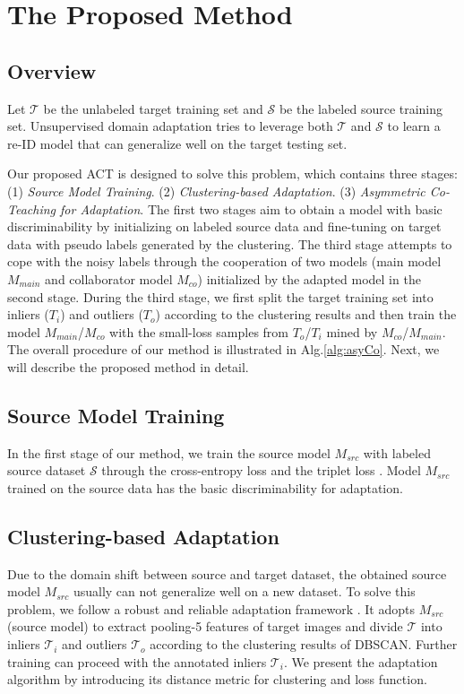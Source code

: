 \documentclass[letterpaper]{article} \usepackage{aaai20}  \usepackage{times}  \usepackage{helvet} \usepackage{courier}  \usepackage[hyphens]{url}  \usepackage{graphicx} \urlstyle{rm} \def\UrlFont{\rm}  \usepackage{graphicx}  \frenchspacing  \setlength{\pdfpagewidth}{8.5in}  \setlength{\pdfpageheight}{11in}  \usepackage{color}
\begin{document}
\section{The Proposed Method}
\subsection{Overview}

Let $\mathcal{T}$ be the unlabeled target training set and $\mathcal{S}$ be the labeled source training set. Unsupervised domain adaptation tries to leverage both $\mathcal{T}$ and $\mathcal{S}$ to learn a re-ID model that can generalize well on the target testing set. 

Our proposed ACT is designed to solve this problem, which contains three stages: (1) \textit{Source Model Training}. (2) \textit{Clustering-based Adaptation}. (3) \textit{Asymmetric Co-Teaching for Adaptation}. The first two stages aim to obtain a model with basic discriminability by initializing on labeled source data and fine-tuning on target data with pseudo labels generated by the clustering. The third stage attempts to cope with the noisy labels through the cooperation of two models (main model $M_{main}$ and collaborator model $M_{co}$) initialized by the adapted model in the second stage. During the third stage, we first split the target training set into inliers ($T_i$) and outliers ($T_o$) according to the clustering results and then train the model $M_{main}$/$M_{co}$ with  the  small-loss samples  from $T_o$/$T_i$ mined by $M_{co}$/$M_{main}$. The overall procedure of our method is illustrated in Alg.\ref{alg:asyCo}. Next, we will describe the proposed method in detail.


\subsection{Source Model Training} 
In the first stage of our method, we train the source model $M_{src}$ with labeled source dataset $\mathcal{S}$ through the cross-entropy loss and the triplet loss \cite{HermansBeyer2017Arxiv}. Model $M_{src}$ trained on the source data has the basic discriminability for adaptation. 



\subsection{Clustering-based Adaptation}
Due to the domain shift between source and target dataset, the obtained source model $M_{src}$ usually can not generalize well on a new dataset. To solve this problem, we follow a robust and reliable adaptation framework \cite{song2018unsupervised}. It adopts $M_{src}$ (source model) to extract pooling-5 features of target images and divide $\mathcal{T}$ into inliers $\mathcal{T}_i$ and outliers $\mathcal{T}_o$ according to the clustering results of DBSCAN. Further training can proceed with the annotated inliers $\mathcal{T}_i$. We present the adaptation algorithm by introducing its distance metric for clustering and loss function.
\end{document}
